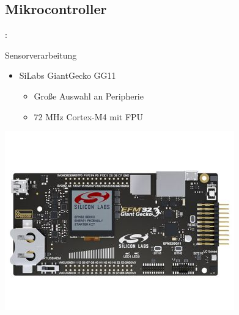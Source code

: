\documentclass{beamer}
\begin{document}
\subsection{Mikrocontroller}
\begin{frame}{\insertsection: \insertsubsection}
\begin{minipage}{0.45\linewidth}
	
	Sensorverarbeitung
	
	\begin{itemize}
		\item SiLabs GiantGecko GG11
		\begin{itemize}
			\item Große Auswahl an Peripherie
			\item 72 MHz Cortex-M4 mit FPU
		\end{itemize}
	\end{itemize}

\end{minipage} \quad
\begin{minipage}{0.45\linewidth}
	\includegraphics[width=\linewidth]{efm32}
\end{minipage}
\end{frame}
\end{document}
